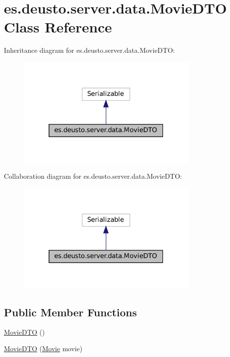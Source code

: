 \hypertarget{classes_1_1deusto_1_1server_1_1data_1_1_movie_d_t_o}{}\section{es.\+deusto.\+server.\+data.\+Movie\+D\+TO Class Reference}
\label{classes_1_1deusto_1_1server_1_1data_1_1_movie_d_t_o}


Inheritance diagram for es.\+deusto.\+server.\+data.\+Movie\+D\+TO\+:
\nopagebreak
\begin{figure}[H]
\begin{center}
\leavevmode
\includegraphics[width=256pt]{classes_1_1deusto_1_1server_1_1data_1_1_movie_d_t_o__inherit__graph}
\end{center}
\end{figure}


Collaboration diagram for es.\+deusto.\+server.\+data.\+Movie\+D\+TO\+:
\nopagebreak
\begin{figure}[H]
\begin{center}
\leavevmode
\includegraphics[width=256pt]{classes_1_1deusto_1_1server_1_1data_1_1_movie_d_t_o__coll__graph}
\end{center}
\end{figure}
\subsection*{Public Member Functions}
\begin{DoxyCompactItemize}
\item 
\mbox{\hyperlink{classes_1_1deusto_1_1server_1_1data_1_1_movie_d_t_o_a8dab5027de00475ceb896ad89af993b7}{Movie\+D\+TO}} ()
\item 
\mbox{\hyperlink{classes_1_1deusto_1_1server_1_1data_1_1_movie_d_t_o_ad09b9cd627c8906f7ab7fe86d09b9e75}{Movie\+D\+TO}} (\mbox{\hyperlink{classes_1_1deusto_1_1server_1_1jdo_1_1_movie}{Movie}} movie)
\end{DoxyCompactItemize}
